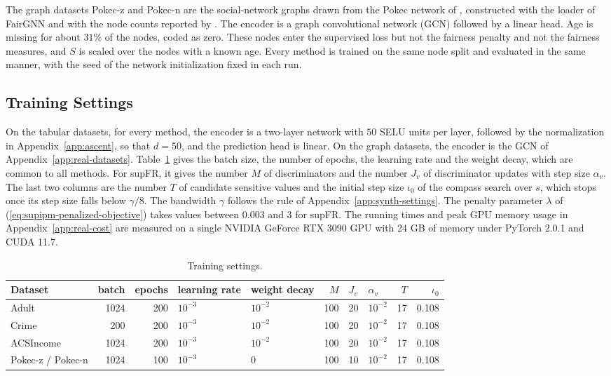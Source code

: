 \documentclass{article} %
\begin{document}
The graph datasets Pokec-z and Pokec-n are the social-network graphs drawn from the Pokec network of \citet{takac2012data}, constructed with the loader of FairGNN \citep{dai2021say} and with the node counts reported by \citet{kong2025fair}. The encoder is a graph convolutional network (GCN) \citep{kipf2016semi} followed by a linear head.  Age is missing for about $31\%$ of the nodes, coded as zero. These nodes enter the supervised loss but not the fairness penalty and not the fairness measures, and $S$ is scaled over the nodes with a known age.  Every method is trained on the same node split and evaluated in the same manner, with the seed of the network initialization fixed in each run.

\subsection{Training Settings}
\label{app:real-settings}

On the tabular datasets, for every method, the encoder is a two-layer network with $50$ SELU units \citep{klambauer2017self} per layer, followed by the normalization in Appendix~\ref{app:ascent}, so that $d=50$, and the prediction head is linear. On the graph datasets, the encoder is the GCN of Appendix~\ref{app:real-datasets}.  Table~\ref{tab:hyperparameters} gives the batch size, the number of epochs, the learning rate and the weight decay, which are common to all methods.  For supFR, it gives the number $M$ of discriminators and the number $J_v$ of discriminator updates with step size $\alpha_v$.  The last two columns are the number $T$ of candidate sensitive values and the initial step size $\iota_0$ of the compass search over $s$, which stops once its step size falls below $\gamma/8$.
The bandwidth $\gamma$ follows the rule of Appendix~\ref{app:synth-settings}.
The penalty parameter $\lambda$ of (\ref{eq:supipm-penalized-objective}) takes values between $0.003$ and $3$ for supFR.
The running times and peak GPU memory usage in Appendix~\ref{app:real-cost} are measured on a single NVIDIA GeForce RTX 3090 GPU with 24 GB of memory under PyTorch 2.0.1 and CUDA 11.7.

\begin{table}[!htb]
\centering
\footnotesize
\caption{Training settings.}
\label{tab:hyperparameters}
\setlength{\tabcolsep}{4pt}
\begin{tabular}{lrrllrllrr}
\toprule
Dataset & batch & epochs & learning rate & weight decay & $M$ & $J_v$ & $\alpha_v$ & $T$ & $\iota_0$ \\
\midrule
Adult                & 1024 & 200 & $10^{-3}$ & $10^{-2}$ & 100 & 20 & $10^{-2}$ & 17 & 0.108 \\
Crime                & 200  & 200 & $10^{-3}$ & $10^{-2}$ & 100 & 20 & $10^{-2}$ & 17 & 0.108 \\
ACSIncome            & 1024 & 200 & $10^{-3}$ & $10^{-2}$ & 100 & 20 & $10^{-2}$ & 17 & 0.108 \\
Pokec-z / Pokec-n    & 1024 & 100 & $10^{-3}$ & 0         & 100 & 10 & $10^{-2}$ & 17 & 0.108 \\
\bottomrule
\end{tabular}
\end{table}
\end{document}
